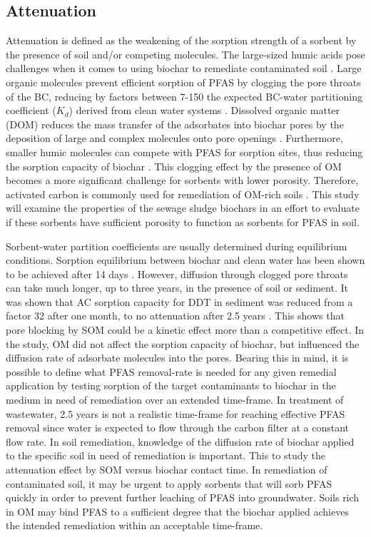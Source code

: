\subsection{Attenuation \label{sec:attenuation}}
Attenuation is defined as the weakening of the sorption strength of a sorbent by the presence of soil and/or competing molecules. The large-sized humic acids pose challenges when it comes to using biochar to remediate contaminated soil  \citep{mahinroosta2020review}. Large organic molecules prevent efficient sorption of PFAS by clogging the pore throats of the BC, reducing by factors between 7-150 the expected BC-water partitioning coefficient ($K_d$) derived from clean water systems \citep{hale2009sorption, Teixido2013, cornelissen2004sorption}. Dissolved organic matter (DOM) reduces the mass transfer of the adsorbates into biochar pores by the deposition of large and complex molecules onto pore openings \citep{pignatello2006effect}. Furthermore, smaller humic molecules can compete with PFAS for sorption sites, thus reducing the sorption capacity of biochar \citep{du2014adsorption}. This clogging effect by the presence of OM becomes a more significant challenge for sorbents with lower porosity. Therefore, activated carbon is commonly used for remediation of OM-rich soils \citep{Sormo2021}. This study will examine the properties of the sewage sludge biochars in an effort to evaluate if these sorbents have sufficient porosity to function as sorbents for PFAS in soil. 

Sorbent-water partition coefficients are usually determined during equilibrium conditions. Sorption equilibrium between biochar and clean water has been shown to be achieved after 14 days \citep{Kupryianchyk2016b}. However, diffusion through clogged pore throats can take much longer, up to three years, in the presence of soil or sediment. It was shown that AC sorption capacity for DDT in sediment was reduced from a factor 32 after one month, to no attenuation after 2.5 years \citep{hale2009sorption}. This shows that pore blocking by SOM could be a kinetic effect more than a competitive effect. In the \cite{hale2009sorption} study, OM did not affect the sorption capacity of biochar, but influenced the diffusion rate of adsorbate molecules into the pores. Bearing this in mind, it is possible to define what PFAS removal-rate is needed for any given remedial application by testing sorption of the target contaminants to biochar in the medium in need of remediation over an extended time-frame. In treatment of wastewater, 2.5 years is not a realistic time-frame for reaching effective PFAS removal since water is expected to flow through the carbon filter at a constant flow rate. In soil remediation, knowledge of the diffusion rate of biochar applied to the specific soil in need of remediation is important. This to study the attenuation effect by SOM versus biochar contact time. In remediation of contaminated soil, it may be urgent to apply sorbents that will sorb PFAS quickly in order to prevent further leaching of PFAS into groundwater. Soils rich in OM may bind PFAS to a sufficient degree that the biochar applied achieves the intended remediation within an acceptable time-frame. 

